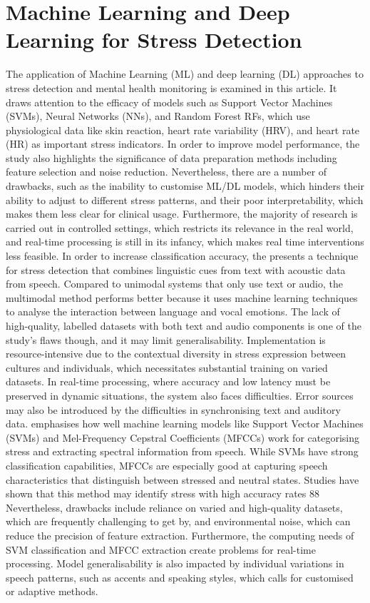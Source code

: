 \documentclass[Arial,12pt,openright,twoside]{book}
\begin{document}
  \section{Machine Learning and Deep Learning for Stress Detection}
  The application of Machine Learning (ML) and deep learning (DL) approaches to stress detection and mental health monitoring is examined in this article\cite{razavi2024}. It draws attention to the efficacy of models such as Support Vector Machines (SVMs), Neural Networks (NNs), and Random Forest RFs, which use physiological data like skin reaction, heart rate variability (HRV), and heart rate (HR) as important stress indicators. In order to improve model performance, the study also highlights the significance of data preparation methods including feature selection and noise reduction. Nevertheless, there are a number of drawbacks, such as the inability to customise ML/DL models, which hinders their ability to adjust to different stress patterns, and their poor interpretability, which makes them less clear for clinical usage. Furthermore, the majority of research is carried out in controlled settings, which restricts its relevance in the real world, and real-time processing is still in its infancy, which makes real time interventions less feasible.
  In order to increase classification accuracy, the \cite{yao2021} presents a technique for stress detection that combines linguistic cues from text with acoustic data from speech. Compared to unimodal systems that only use text or audio, the multimodal method performs better because it uses machine learning techniques to analyse the interaction between language and vocal emotions. The lack of high-quality, labelled datasets with both text and audio components is one of the study's flaws though, and it may limit generalisability. Implementation is resource-intensive due to the contextual diversity in stress expression between cultures and individuals, which necessitates substantial training on varied datasets. In real-time processing, where accuracy and low latency must be preserved in dynamic situations, the system also faces difficulties. Error sources may also be introduced by the difficulties in synchronising text and auditory data. 
  \cite{hilmy2021} emphasises how well machine learning models like Support Vector Machines (SVMs) and Mel-Frequency Cepstral Coefficients (MFCCs) work for categorising stress and extracting spectral information from speech. While SVMs have strong classification capabilities, MFCCs are especially good at capturing speech characteristics that distinguish between stressed and neutral states. Studies have shown that this method may identify stress with high accuracy rates 88 Nevertheless, drawbacks include reliance on varied and high-quality datasets, which are frequently challenging to get by, and environmental noise, which can reduce the precision of feature extraction. Furthermore, the computing needs of SVM classification and MFCC extraction create problems for real-time processing. Model generalisability is also impacted by individual variations in speech patterns, such as accents and speaking styles, which calls for customised or adaptive methods. 
\end{document}
